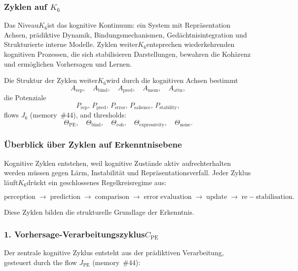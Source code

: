 
\subsubsection{Zyklen auf \texorpdfstring{$K_6$}{K_6}}
\label{sec:cycles-k6}

Das Niveau$K_6$ist das kognitive Kontinuum: ein System mit Repräsentation
Achsen, prädiktive Dynamik, Bindungsmechanismen, Gedächtnisintegration und
Strukturierte interne Modelle.
Zyklen weiter$K_6$entsprechen wiederkehrenden kognitiven Prozessen, die sich stabilisieren
Darstellungen, bewahren die Kohärenz und ermöglichen Vorhersagen und Lernen.

Die Struktur der Zyklen weiter$K_6$wird durch die kognitiven Achsen bestimmt
\[
 A_{\mathrm{rep}},\quad
 A_{\mathrm{bind}},\quad
 A_{\mathrm{pred}},\quad
 A_{\mathrm{mem}},\quad
 A_{\mathrm{attn}},
\]
die Potenziale
\[
 P_{\mathrm{rep}},\, P_{\mathrm{pred}},\, P_{\mathrm{error}},\, 
 P_{\mathrm{salience}},\, P_{\mathrm{stability}},
\]
flows $J_6$ (memory~\#44), and thresholds:
\[
 \Theta_{\mathrm{PE}},\quad
 \Theta_{\mathrm{bind}},\quad
 \Theta_{\mathrm{coh}},\quad
 \Theta_{\mathrm{expressivity}},\quad
 \Theta_{\mathrm{noise}}.
\]

\subsubsection{Überblick über Zyklen auf Erkenntnisebene}

Kognitive Zyklen entstehen, weil kognitive Zustände aktiv aufrechterhalten werden müssen
gegen Lärm, Instabilität und Repräsentationsverfall.
Jeder Zyklus läuft$K_6$drückt ein geschlossenes Regelkreisregime aus:

\[
  \mathrm{perception}
  \;\to\;
  \mathrm{prediction}
  \;\to\;
  \mathrm{comparison}
  \;\to\;
  \mathrm{error\;evaluation}
  \;\to\;
  \mathrm{update}
  \;\to\;
  \mathrm{re-stabilisation}.
\]

Diese Zyklen bilden die strukturelle Grundlage der Erkenntnis.

\subsubsection{1. Vorhersage-Verarbeitungszyklus$C_{\mathrm{PE}}$}

Der zentrale kognitive Zyklus entsteht aus der prädiktiven Verarbeitung, gesteuert durch
the flow $J_{\mathrm{PE}}$ (memory~\#44):


